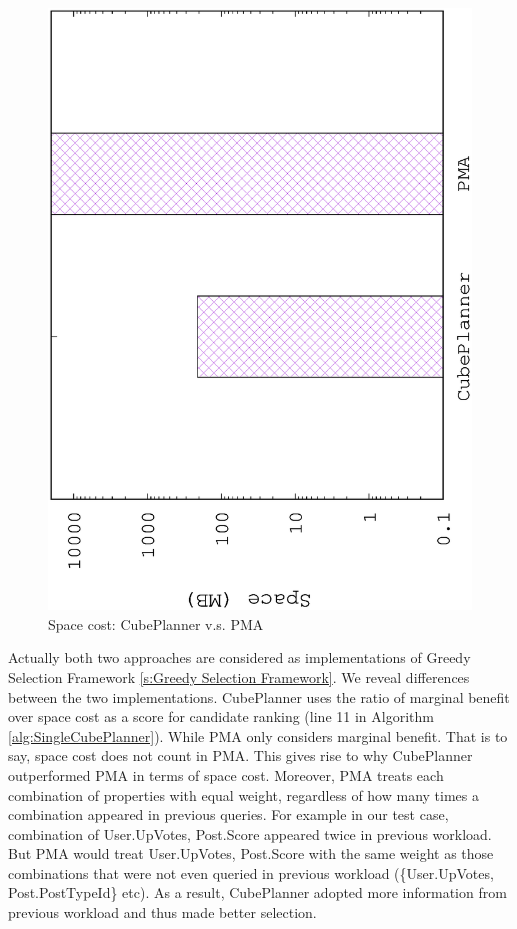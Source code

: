 \begin{figure}[H]
\centering
\includegraphics[scale=0.5, angle=270]{plot/jiaweispace.eps}
\caption{Space cost: CubePlanner v.s. PMA}
\label{fig:jiaweispace}
\end{figure}

Actually both two approaches are considered as implementations of Greedy Selection Framework \ref{s:Greedy Selection Framework}. We reveal differences between the two implementations. CubePlanner uses the ratio of marginal benefit over space cost as a score for candidate ranking (line 11 in Algorithm \ref{alg:SingleCubePlanner}). While PMA only considers marginal benefit. That is to say, space cost does not count in PMA. This gives rise to why CubePlanner outperformed PMA in terms of space cost. Moreover, PMA treats each combination of properties with equal weight, regardless of how many times a combination appeared in previous queries. For example in our test case, combination of {User.UpVotes, Post.Score} appeared twice in previous workload. But PMA would treat {User.UpVotes, Post.Score} with the same weight as those combinations that were not even queried in previous workload (\{User.UpVotes, Post.PostTypeId\} etc). As a result, CubePlanner adopted more information from previous workload and thus made better selection. 

